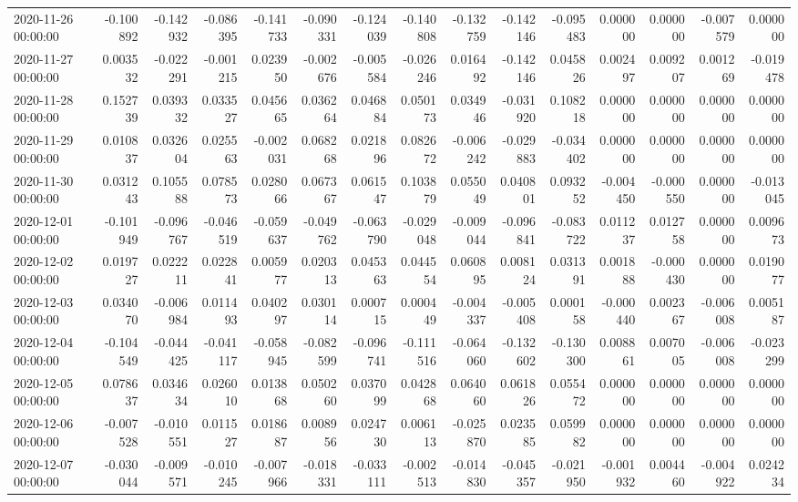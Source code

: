 \begin{tabular}{lrrrrrrrrrrrrrr}
2020-11-26 00:00:00 & -0.100892 & -0.142932 & -0.086395 & -0.141733 & -0.090331 & -0.124039 & -0.140808 & -0.132759 & -0.142146 & -0.095483 & 0.000000 & 0.000000 & -0.007579 & 0.000000 \\
2020-11-27 00:00:00 & 0.003532 & -0.022291 & -0.001215 & 0.023950 & -0.002676 & -0.005584 & -0.026246 & 0.016492 & -0.142146 & 0.045826 & 0.002497 & 0.009207 & 0.001269 & -0.019478 \\
2020-11-28 00:00:00 & 0.152739 & 0.039332 & 0.033527 & 0.045665 & 0.036264 & 0.046884 & 0.050173 & 0.034946 & -0.031920 & 0.108218 & 0.000000 & 0.000000 & 0.000000 & 0.000000 \\
2020-11-29 00:00:00 & 0.010837 & 0.032604 & 0.025563 & -0.002031 & 0.068268 & 0.021896 & 0.082672 & -0.006242 & -0.029883 & -0.034402 & 0.000000 & 0.000000 & 0.000000 & 0.000000 \\
2020-11-30 00:00:00 & 0.031243 & 0.105588 & 0.078573 & 0.028066 & 0.067367 & 0.061547 & 0.103879 & 0.055049 & 0.040801 & 0.093252 & -0.004450 & -0.000550 & 0.000000 & -0.013045 \\
2020-12-01 00:00:00 & -0.101949 & -0.096767 & -0.046519 & -0.059637 & -0.049762 & -0.063790 & -0.029048 & -0.009044 & -0.096841 & -0.083722 & 0.011237 & 0.012758 & 0.000000 & 0.009673 \\
2020-12-02 00:00:00 & 0.019727 & 0.022211 & 0.022841 & 0.005977 & 0.020313 & 0.045363 & 0.044554 & 0.060895 & 0.008124 & 0.031391 & 0.001888 & -0.000430 & 0.000000 & 0.019077 \\
2020-12-03 00:00:00 & 0.034070 & -0.006984 & 0.011493 & 0.040297 & 0.030114 & 0.000715 & 0.000449 & -0.004337 & -0.005408 & 0.000158 & -0.000440 & 0.002367 & -0.006008 & 0.005187 \\
2020-12-04 00:00:00 & -0.104549 & -0.044425 & -0.041117 & -0.058945 & -0.082599 & -0.096741 & -0.111516 & -0.064060 & -0.132602 & -0.130300 & 0.008861 & 0.007005 & -0.006008 & -0.023299 \\
2020-12-05 00:00:00 & 0.078637 & 0.034634 & 0.026010 & 0.013868 & 0.050260 & 0.037099 & 0.042868 & 0.064060 & 0.061826 & 0.055472 & 0.000000 & 0.000000 & 0.000000 & 0.000000 \\
2020-12-06 00:00:00 & -0.007528 & -0.010551 & 0.011527 & 0.018687 & 0.008956 & 0.024730 & 0.006113 & -0.025870 & 0.023585 & 0.059982 & 0.000000 & 0.000000 & 0.000000 & 0.000000 \\
2020-12-07 00:00:00 & -0.030044 & -0.009571 & -0.010245 & -0.007966 & -0.018331 & -0.033111 & -0.002513 & -0.014830 & -0.045357 & -0.021950 & -0.001932 & 0.004460 & -0.004922 & 0.024234 \\

\end{tabular}
